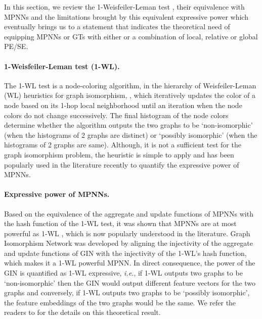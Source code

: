 \documentclass{article}
\begin{document}
In this section, we review the 1-Weisfeiler-Leman test \cite{weisfeiler1968reduction}, their equivalence with MPNNs and the limitations brought by this equivalent expressive power which eventually brings us to a statement that indicates the theoretical need of equipping MPNNs or GTs with either or a combination of local, relative or global PE/SE.


\paragraph{1-Weisfeiler-Leman test (1-WL).}
The 1-WL test is a node-coloring algorithm, in the hierarchy of Weisfeiler-Leman (WL) heuristics for graph isomorphism, \cite{weisfeiler1968reduction}, which iteratively updates the color of a node based on its 1-hop local neighborhood until an iteration when the node colors do not change successively. The final histogram of the node colors determine whether the algorithm outputs the two graphs to be `non-isomorphic' (when the histograms of 2 graphs are distinct) or `possibly isomorphic' (when the histograms of 2 graphs are same). Although, it is not a sufficient test for the graph isomorphism problem, the heuristic is simple to apply and has been popularly used in the literature recently to quantify the expressive power of MPNNs.


\paragraph{Expressive power of MPNNs.} Based on the equivalence of the aggregate and update functions of MPNNs with the hash function of the 1-WL test, it was shown that MPNNs are at most powerful as 1-WL \cite{xu2018how, morris2019}, which is now popularly understood in the literature. Graph Isomorphism Network \cite{xu2018how} was developed by aligning the injectivity of the aggregate and update functions of GIN with the injectivity of the 1-WL's hash function, which makes it a 1-WL powerful MPNN. In direct consequence, the power of the GIN is quantified as 1-WL expressive, \textit{i.e.}, if 1-WL outputs two graphs to be `non-isomorphic' then the GIN would output different feature vectors for the two graphs and conversely, if 1-WL outputs two graphs to be `possibly isomorphic', the feature embeddings of the two graphs would be the same. We refer the readers to \cite{xu2018how} for the details on this theoretical result.
\end{document}
